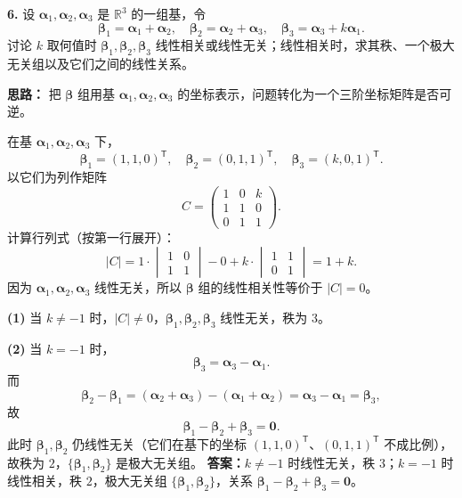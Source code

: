 \textbf{6.} 设 \(\boldsymbol{\alpha}_1,\boldsymbol{\alpha}_2,\boldsymbol{\alpha}_3\) 是 \(\mathbb R^3\) 的一组基，令
\[
\boldsymbol{\beta}_1=\boldsymbol{\alpha}_1+\boldsymbol{\alpha}_2,\quad
\boldsymbol{\beta}_2=\boldsymbol{\alpha}_2+\boldsymbol{\alpha}_3,\quad
\boldsymbol{\beta}_3=\boldsymbol{\alpha}_3+k\boldsymbol{\alpha}_1.
\]
讨论 \(k\) 取何值时 \(\boldsymbol{\beta}_1,\boldsymbol{\beta}_2,\boldsymbol{\beta}_3\) 线性相关或线性无关；线性相关时，求其秩、一个极大无关组以及它们之间的线性关系。

\ifshowsolutions%
\textbf{思路：} 把 \(\boldsymbol{\beta}\) 组用基 \(\boldsymbol{\alpha}_1,\boldsymbol{\alpha}_2,\boldsymbol{\alpha}_3\) 的坐标表示，问题转化为一个三阶坐标矩阵是否可逆。

在基 \(\boldsymbol{\alpha}_1,\boldsymbol{\alpha}_2,\boldsymbol{\alpha}_3\) 下，
\[
\boldsymbol{\beta}_1=(1,1,0)^{\mathsf T},\quad
\boldsymbol{\beta}_2=(0,1,1)^{\mathsf T},\quad
\boldsymbol{\beta}_3=(k,0,1)^{\mathsf T}.
\]
以它们为列作矩阵
\[
C=\begin{pmatrix}
1&0&k\\
1&1&0\\
0&1&1
\end{pmatrix}.
\]
计算行列式（按第一行展开）：
\[
|C|=1\cdot\begin{vmatrix}1&0\\1&1\end{vmatrix}
-0+k\cdot\begin{vmatrix}1&1\\0&1\end{vmatrix}
=1+k.
\]
因为 \(\boldsymbol{\alpha}_1,\boldsymbol{\alpha}_2,\boldsymbol{\alpha}_3\) 线性无关，所以 \(\boldsymbol{\beta}\) 组的线性相关性等价于 \(|C|=0\)。

\textbf{(1)} 当 \(k\ne-1\) 时，\(|C|\ne0\)，\(\boldsymbol{\beta}_1,\boldsymbol{\beta}_2,\boldsymbol{\beta}_3\) 线性无关，秩为 \(3\)。

\textbf{(2)} 当 \(k=-1\) 时，
\[
\boldsymbol{\beta}_3=\boldsymbol{\alpha}_3-\boldsymbol{\alpha}_1.
\]
而
\[
\boldsymbol{\beta}_2-\boldsymbol{\beta}_1
=(\boldsymbol{\alpha}_2+\boldsymbol{\alpha}_3)-(\boldsymbol{\alpha}_1+\boldsymbol{\alpha}_2)
=\boldsymbol{\alpha}_3-\boldsymbol{\alpha}_1
=\boldsymbol{\beta}_3,
\]
故
\[
\boldsymbol{\beta}_1-\boldsymbol{\beta}_2+\boldsymbol{\beta}_3=\boldsymbol{0}.
\]
此时 \(\boldsymbol{\beta}_1,\boldsymbol{\beta}_2\) 仍线性无关（它们在基下的坐标 \((1,1,0)^{\mathsf T}\)、\((0,1,1)^{\mathsf T}\) 不成比例），故秩为 \(2\)，\(\{\boldsymbol{\beta}_1,\boldsymbol{\beta}_2\}\) 是极大无关组。
\textbf{答案：}$k\ne-1$ 时线性无关，秩 $3$；$k=-1$ 时线性相关，秩 $2$，极大无关组 $\{\boldsymbol{\beta}_1,\boldsymbol{\beta}_2\}$，关系 $\boldsymbol{\beta}_1-\boldsymbol{\beta}_2+\boldsymbol{\beta}_3=\boldsymbol{0}$。
\else \answerarea[8] \fi%

